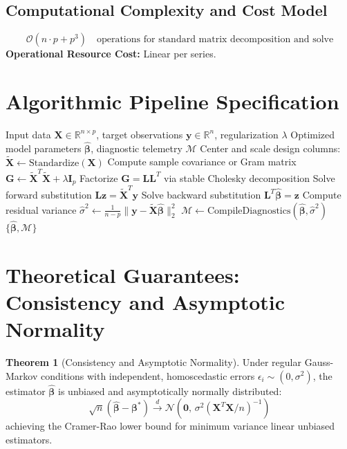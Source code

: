 \documentclass[11pt,a4paper]{article}
\theoremstyle{definition}
\newtheorem{theorem}{\textbf{Theorem}}[section]
\begin{document}
\subsection{Computational Complexity and Cost Model}
\begin{equation}
\mathcal{O}(n \cdot p + p^3) \quad \text{operations for standard matrix decomposition and solve}
\end{equation}
\textbf{Operational Resource Cost:} Linear per series.

\section{Algorithmic Pipeline Specification}

\begin{algorithm}[H]
\caption{Seasonal hybrid ESD Execution}
\begin{algorithmic}[1]
\Require Input data $\mathbf{X} \in \mathbb{R}^{n \times p}$, target observations $\mathbf{y} \in \mathbb{R}^n$, regularization $\lambda$
\Ensure Optimized model parameters $\hat{\boldsymbol{\beta}}$, diagnostic telemetry $\mathcal{M}$
\State Center and scale design columns: $\tilde{\mathbf{X}} \gets \text{Standardize}(\mathbf{X})$
\State Compute sample covariance or Gram matrix $\mathbf{G} \gets \tilde{\mathbf{X}}^T \tilde{\mathbf{X}} + \lambda \mathbf{I}_p$
\State Factorize $\mathbf{G} = \mathbf{L} \mathbf{L}^T$ via stable Cholesky decomposition
\State Solve forward substitution $\mathbf{L} \mathbf{z} = \tilde{\mathbf{X}}^T \mathbf{y}$
\State Solve backward substitution $\mathbf{L}^T \hat{\boldsymbol{\beta}} = \mathbf{z}$
\State Compute residual variance $\hat{\sigma}^2 \gets \frac{1}{n - p} \| \mathbf{y} - \tilde{\mathbf{X}} \hat{\boldsymbol{\beta}} \|_2^2$
\State $\mathcal{M} \gets \text{CompileDiagnostics}(\hat{\boldsymbol{\beta}}, \hat{\sigma}^2)$
\State \Return $\{\hat{\boldsymbol{\beta}}, \mathcal{M}\}$
\end{algorithmic}
\end{algorithm}

\section{Theoretical Guarantees: Consistency and Asymptotic Normality}

\begin{theorem}[Consistency and Asymptotic Normality]
Under regular Gauss-Markov conditions with independent, homoscedastic errors $\epsilon_i \sim (0, \sigma^2)$, the estimator $\hat{\boldsymbol{\beta}}$ is unbiased and asymptotically normally distributed:
\begin{equation}
\sqrt{n}(\hat{\boldsymbol{\beta}} - \boldsymbol{\beta}^*) \xrightarrow{d} \mathcal{N}\left(\mathbf{0}, \, \sigma^2 (\mathbf{X}^T \mathbf{X} / n)^{-1}\right)
\end{equation}
achieving the Cramer-Rao lower bound for minimum variance linear unbiased estimators.
\end{theorem}
\end{document}
